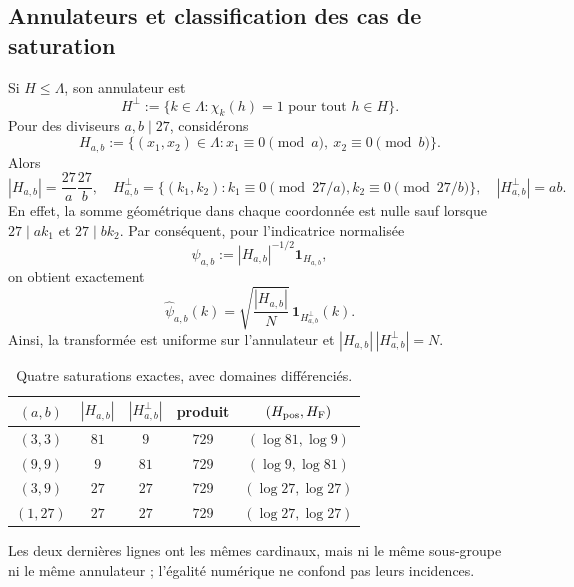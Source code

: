 \subsection{Annulateurs et classification des cas de saturation}
\label{v:n19:sec:anuladores}

Si \(H\le\Lambda\), son annulateur est
\begin{equation}
 H^\perp:=\{k\in\Lambda:\chi_k(h)=1\text{ pour tout }h\in H\}.
 \label{v:n19:eq:anulador}
\end{equation}
Pour des diviseurs \(a,b\mid27\), considérons
\begin{equation}
 H_{a,b}:=\{(x_1,x_2)\in\Lambda:
 x_1\equiv0\pmod a,\ x_2\equiv0\pmod b\}.
 \label{v:n19:eq:subgrupo-rectangular}
\end{equation}
Alors
\begin{equation}
 |H_{a,b}|=\frac{27}{a}\frac{27}{b},
 \quad
 H_{a,b}^{\perp}
 =\{(k_1,k_2):k_1\equiv0\pmod{27/a},
                  k_2\equiv0\pmod{27/b}\},
 \quad |H_{a,b}^{\perp}|=ab.
 \label{v:n19:eq:anulador-explicito}
\end{equation}
En effet, la somme géométrique dans chaque coordonnée est nulle sauf lorsque
\(27\mid ak_1\) et \(27\mid bk_2\). Par conséquent, pour l’indicatrice
normalisée
\begin{equation}
 \psi_{a,b}:=|H_{a,b}|^{-1/2}\mathbf1_{H_{a,b}},
 \label{v:n19:eq:indicador-normalizado}
\end{equation}
on obtient exactement
\begin{equation}
 \widehat\psi_{a,b}(k)
 =\sqrt{\frac{|H_{a,b}|}{N}}\,
   \mathbf1_{H_{a,b}^{\perp}}(k).
 \label{v:n19:eq:fourier-indicador}
\end{equation}
Ainsi, la transformée est uniforme sur l’annulateur et
\(|H_{a,b}|\,|H_{a,b}^{\perp}|=N\).

\begin{table}[htbp]
\centering
\caption{Quatre saturations exactes, avec domaines différenciés.}
\label{v:n19:tab:saturaciones}
\begin{tabular}{@{}ccccc@{}}
\toprule
\((a,b)\) & \(|H_{a,b}|\) & \(|H_{a,b}^{\perp}|\) & produit
 & \((H_{\rm pos},H_{\rm F})\) \\
\midrule
\((3,3)\)  & \(81\) & \(9\)  & \(729\) & \((\log81,\log9)\) \\
\((9,9)\)  & \(9\)  & \(81\) & \(729\) & \((\log9,\log81)\) \\
\((3,9)\)  & \(27\) & \(27\) & \(729\) & \((\log27,\log27)\) \\
\((1,27)\) & \(27\) & \(27\) & \(729\) & \((\log27,\log27)\) \\
\bottomrule
\end{tabular}
\end{table}
Les deux dernières lignes ont les mêmes cardinaux, mais ni le
même sous-groupe ni le même annulateur ; l’égalité numérique ne confond pas leurs
incidences.

